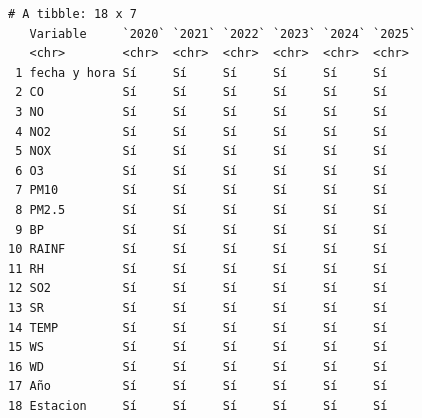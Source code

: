 \documentclass[
  letterpaper,
  DIV=11,
  numbers=noendperiod]{scrartcl}
\begin{document}
\begin{verbatim}
# A tibble: 18 x 7
   Variable     `2020` `2021` `2022` `2023` `2024` `2025`
   <chr>        <chr>  <chr>  <chr>  <chr>  <chr>  <chr> 
 1 fecha y hora Sí     Sí     Sí     Sí     Sí     Sí    
 2 CO           Sí     Sí     Sí     Sí     Sí     Sí    
 3 NO           Sí     Sí     Sí     Sí     Sí     Sí    
 4 NO2          Sí     Sí     Sí     Sí     Sí     Sí    
 5 NOX          Sí     Sí     Sí     Sí     Sí     Sí    
 6 O3           Sí     Sí     Sí     Sí     Sí     Sí    
 7 PM10         Sí     Sí     Sí     Sí     Sí     Sí    
 8 PM2.5        Sí     Sí     Sí     Sí     Sí     Sí    
 9 BP           Sí     Sí     Sí     Sí     Sí     Sí    
10 RAINF        Sí     Sí     Sí     Sí     Sí     Sí    
11 RH           Sí     Sí     Sí     Sí     Sí     Sí    
12 SO2          Sí     Sí     Sí     Sí     Sí     Sí    
13 SR           Sí     Sí     Sí     Sí     Sí     Sí    
14 TEMP         Sí     Sí     Sí     Sí     Sí     Sí    
15 WS           Sí     Sí     Sí     Sí     Sí     Sí    
16 WD           Sí     Sí     Sí     Sí     Sí     Sí    
17 Año          Sí     Sí     Sí     Sí     Sí     Sí    
18 Estacion     Sí     Sí     Sí     Sí     Sí     Sí    
\end{verbatim}
\end{document}
